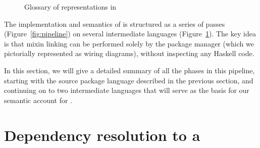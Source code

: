 \begin{figure}
\begin{mdframed}
\begin{description}
\end{description}
\caption{Glossary of representations in \Backpack{}}
\label{fig:glossary}
\end{mdframed}
\end{figure}


The implementation and semantics of \Backpack{} is structured as a
series of passes (Figure~\ref{fig:pipeline}) on several intermediate
languages (Figure~\ref{fig:glossary}).  The key idea is that mixin
linking can be performed solely by the package manager (which we
pictorially represented as wiring diagrams), without inspecting any
Haskell code.

In this section, we will give a detailed summary of all the phases in
this pipeline, starting with the source package language described in
the previous section, and continuing on to two intermediate languages
that will serve as the basis for our semantic account for \Backpack{}.

\section{Dependency resolution to a \ccomp{}}

